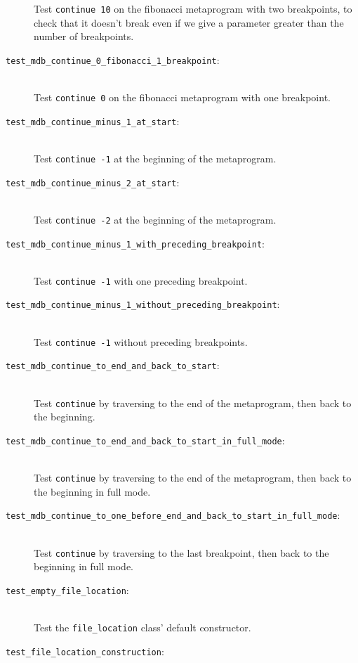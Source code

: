 \begin{description}
        Test \texttt{continue 10} on the fibonacci metaprogram with two
        breakpoints, to check that it doesn't break even if we give a
        parameter greater than the number of breakpoints.
    \item[\texttt{test\_mdb\_continue\_0\_fibonacci\_1\_breakpoint}:] \hfill \\
        Test \texttt{continue 0} on the fibonacci metaprogram with one
        breakpoint.
    \item[\texttt{test\_mdb\_continue\_minus\_1\_at\_start}:] \hfill \\
        Test \texttt{continue -1} at the beginning of the metaprogram.
    \item[\texttt{test\_mdb\_continue\_minus\_2\_at\_start}:] \hfill \\
        Test \texttt{continue -2} at the beginning of the metaprogram.
    \item[\texttt{test\_mdb\_continue\_minus\_1\_with\_preceding\_breakpoint}:] \hfill \\
        Test \texttt{continue -1} with one preceding breakpoint.
    \item[\texttt{test\_mdb\_continue\_minus\_1\_without\_preceding\_breakpoint}:] \hfill \\
        Test \texttt{continue -1} without preceding breakpoints.
    \item[\texttt{test\_mdb\_continue\_to\_end\_and\_back\_to\_start}:] \hfill \\
        Test \texttt{continue} by traversing to the end of the metaprogram,
        then back to the beginning.
    \item[\texttt{test\_mdb\_continue\_to\_end\_and\_back\_to\_start\_in\_full\_mode}:] \hfill \\
        Test \texttt{continue} by traversing to the end of the metaprogram,
        then back to the beginning in full mode.
    \item[\texttt{test\_mdb\_continue\_to\_one\_before\_end\_and\_back\_to\_start\_in\_full\_mode}:] \hfill \\
        Test \texttt{continue} by traversing to the last breakpoint, then back
        to the beginning in full mode.
    \item[\texttt{test\_empty\_file\_location}:] \hfill \\
        Test the \texttt{file\_location} class' default constructor.
    \item[\texttt{test\_file\_location\_construction}:] \hfill \\

\end{description}
